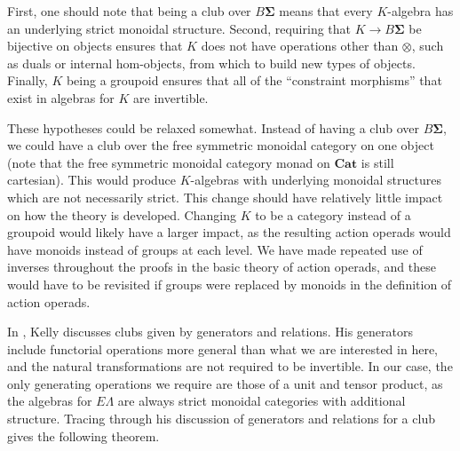 \documentclass{amsbook} %
\newcommand{\mb}{\mathbf}
\numberwithin{section}{chapter}
\begin{document}
\begin{rem}
First, one should note that being a club over $B \mb{\Sigma}$ means that every $K$-algebra has an underlying strict monoidal structure.  Second, requiring that $K \rightarrow B \mb{\Sigma}$ be bijective on objects ensures that $K$ does not have  operations other than $\otimes$, such as duals or internal hom-objects, from which to build new types of objects.  Finally, $K$ being a groupoid ensures that all of the ``constraint morphisms'' that exist in algebras for $K$ are invertible.

These hypotheses could be relaxed somewhat.  Instead of having a club over $B \mb{\Sigma}$, we could have a club over the free symmetric monoidal category on one object (note that the free symmetric monoidal category monad on $\mb{Cat}$ is still cartesian).  This would produce $K$-algebras with underlying monoidal structures which are not necessarily strict.  This change should have relatively little impact on how the theory is developed.  Changing $K$ to be a category instead of a groupoid would likely have a larger impact, as the resulting action operads would have monoids instead of groups at each level.  We have made repeated use of inverses throughout the proofs in the basic theory of action operads, and these would have to be revisited if groups were replaced by monoids in the definition of action operads.
\end{rem}

In \cite{kelly_club1}, Kelly discusses clubs given by generators and relations.  His generators include functorial operations more general than what we are interested in here, and the natural transformations are not required to be invertible.  In our case, the only generating operations we require are those of a unit and tensor product, as the algebras for $E\Lambda$ are always strict monoidal categories with additional structure.  Tracing through his discussion of generators and relations for a club gives the following theorem.
\end{document}
